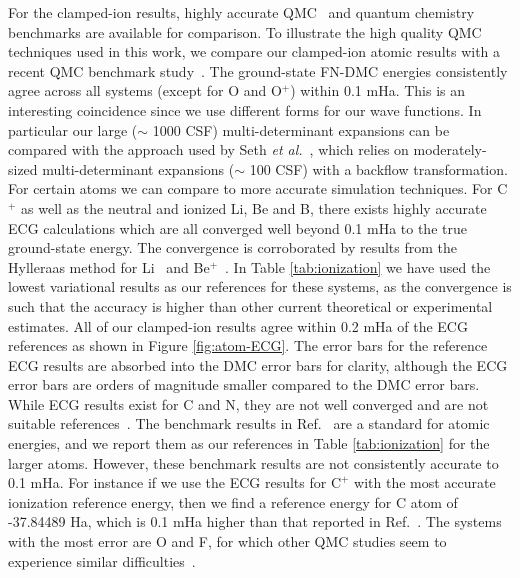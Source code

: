 \documentclass[pra,superscriptaddress,groupedaddress,twocolumn]{revtex4}
\begin{document}
For the clamped-ion results, highly accurate QMC~\cite{Brown_Bench,Toulouse_Bench,Seth_Bench,Morale_Bench,Rappe_Bench} and quantum chemistry benchmarks are available for comparison. To illustrate the high quality QMC techniques used in this work, we compare our clamped-ion atomic results with a recent QMC benchmark study~\cite{Seth_Bench}. The ground-state FN-DMC energies consistently agree across all systems (except for O and O$^{+}$) within 0.1 mHa. This is an interesting coincidence since we use different forms for our wave functions. In particular our large ($\sim$ 1000 CSF) multi-determinant expansions can be compared with the approach used by Seth {\it et al.}~\cite{Seth_Bench}, which relies on moderately-sized multi-determinant expansions ($\sim$ 100 CSF) with a backflow transformation. For certain atoms we can compare to more accurate simulation techniques. For C$^+$ as well as the neutral and ionized Li, Be and B, there exists highly accurate ECG calculations which are all converged well beyond 0.1 mHa to the true ground-state energy. The convergence is corroborated by results from the Hylleraas method for Li~\cite{Wang_Li} and Be$^+$~\cite{Puchalski_Be+}. In Table \ref{tab:ionization} we have used the lowest variational results as our references for these systems, as the convergence is such that the accuracy is higher than other current theoretical or experimental estimates. All of our clamped-ion results agree within 0.2 mHa of the ECG references as shown in Figure \ref{fig:atom-ECG}. The error bars for the reference ECG results are absorbed into the DMC error bars for clarity, although the ECG error bars are orders of magnitude smaller compared to the DMC error bars. While ECG results exist for C and N, they are not well converged and are not suitable references~\cite{Bubin_C,Sharkey_N}. The benchmark results in Ref.~\cite{Davidson_Atoms} are a standard for atomic energies, and we report them as our references in Table \ref{tab:ionization} for the larger atoms. However, these benchmark results are not consistently accurate to 0.1 mHa. For instance if we use the ECG results for $\text{C}^+$ with the most accurate ionization reference energy, then we find a reference energy for C atom of -37.84489 Ha, which is 0.1 mHa higher than that reported in Ref.~\cite{Davidson_Atoms}. %
The systems with the most error are O and F, for which other QMC studies seem to experience similar difficulties~\cite{Seth_Bench,Booth_FCIQMC,Brown_Bench,Shiwei_AFQMC}.
\end{document}
